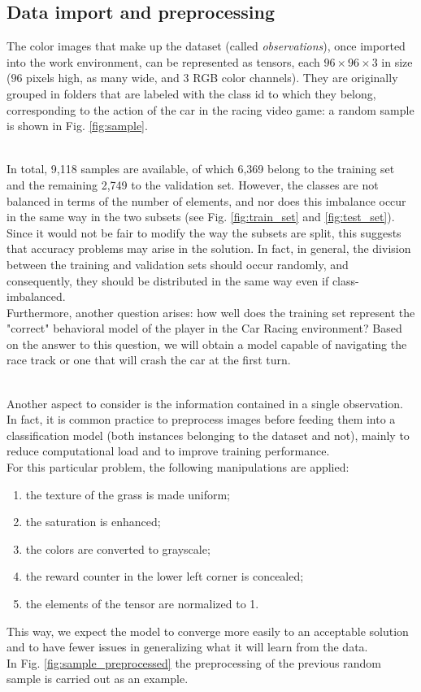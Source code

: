 \subsection{Data import and preprocessing}

\noindent The color images that make up the dataset (called \textit{observations}), once imported into the work environment, can be represented as tensors, each $96\times96\times3$ in size ($96$ pixels high, as many wide, and $3$ RGB color channels). They are originally grouped in folders that are labeled with the class id to which they belong, corresponding to the action of the car in the racing video game: a random sample is shown in Fig. \ref{fig:sample}.

\noindent \\In total, 9,118 samples are available, of which 6,369 belong to the training set and the remaining 2,749 to the validation set. However, the classes are not balanced in terms of the number of elements, and nor does this imbalance occur in the same way in the two subsets (see Fig. \ref{fig:train_set} and \ref{fig:test_set}).
\\Since it would not be fair to modify the way the subsets are split, this suggests that accuracy problems may arise in the solution. In fact, in general, the division between the training and validation sets should occur randomly, and consequently, they should be distributed in the same way even if class-imbalanced.
\\Furthermore, another question arises: how well does the training set represent the "correct" behavioral model of the player in the Car Racing environment? Based on the answer to this question, we will obtain a model capable of navigating the race track or one that will crash the car at the first turn.


\noindent \\Another aspect to consider is the information contained in a single observation. In fact, it is common practice to preprocess images before feeding them into a classification model (both instances belonging to the dataset and not), mainly to reduce computational load and to improve training performance.
\\For this particular problem, the following manipulations are applied:

\begin{enumerate}
    \item the texture of the grass is made uniform;
    \item the saturation is enhanced;
    \item the colors are converted to grayscale;
    \item the reward counter in the lower left corner is concealed;
    \item the elements of the tensor are normalized to 1.
\end{enumerate}

\noindent This way, we expect the model to converge more easily to an acceptable solution and to have fewer issues in generalizing what it will learn from the data. \\In Fig. \ref{fig:sample_preprocessed} the preprocessing of the previous random sample is carried out as an example.
